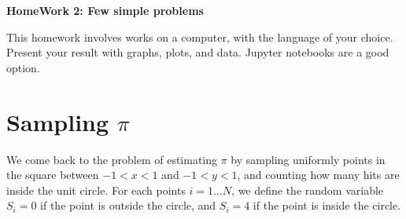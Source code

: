 \documentclass[11pt]{article}
\begin{document}
\begin{center}
{\bf\Large HomeWork 2: Few simple problems}
\end{center}

This homework involves works on a computer, with the language of your choice. Present your result with graphs, plots, and data. Jupyter notebooks are a good option.


\section{Sampling $\pi$}

We come back to the problem of estimating $\pi$ by sampling uniformly points in the square between $-1<x<1$ and $-1<y<1$, and counting how many hits are inside the unit circle. For each points $i=1 \ldots N$, we define the random variable $S_i=0$ if the point is outside the circle, and $S_i=4$ if the point is inside the circle.
\end{document}
